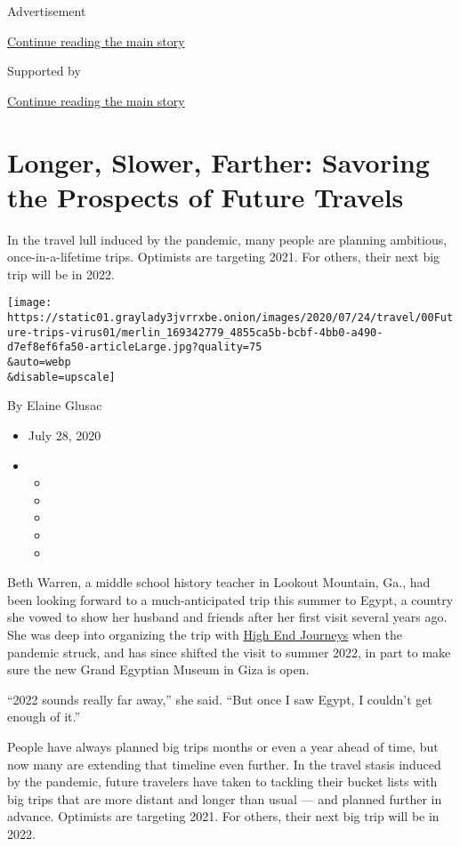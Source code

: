 Advertisement

\protect\hyperlink{after-top}{Continue reading the main story}

Supported by

\protect\hyperlink{after-sponsor}{Continue reading the main story}

\hypertarget{longer-slower-farther-savoring-the-prospects-of-future-travels}{%
\section{Longer, Slower, Farther: Savoring the Prospects of Future
Travels}\label{longer-slower-farther-savoring-the-prospects-of-future-travels}}

In the travel lull induced by the pandemic, many people are planning
ambitious, once-in-a-lifetime trips. Optimists are targeting 2021. For
others, their next big trip will be in 2022.

\texttt{[image: https://static01.graylady3jvrrxbe.onion/images/2020/07/24/travel/00Future-trips-virus01/merlin\_169342779\_4855ca5b-bcbf-4bb0-a490-d7ef8ef6fa50-articleLarge.jpg?quality=75\\\&auto=webp\\\&disable=upscale]}

By Elaine Glusac

\begin{itemize}
\item
  July 28, 2020
\item
  \begin{itemize}
  \item
  \item
  \item
  \item
  \item
  \end{itemize}
\end{itemize}

Beth Warren, a middle school history teacher in Lookout Mountain, Ga.,
had been looking forward to a much-anticipated trip this summer to
Egypt, a country she vowed to show her husband and friends after her
first visit several years ago. She was deep into organizing the trip
with \href{https://www.highendjourneys.com/}{High End Journeys} when the
pandemic struck, and has since shifted the visit to summer 2022, in part
to make sure the new Grand Egyptian Museum in Giza is open.

``2022 sounds really far away,'' she said. ``But once I saw Egypt, I
couldn't get enough of it.''

People have always planned big trips months or even a year ahead of
time, but now many are extending that timeline even further. In the
travel stasis induced by the pandemic, future travelers have taken to
tackling their bucket lists with big trips that are more distant and
longer than usual --- and planned further in advance. Optimists are
targeting 2021. For others, their next big trip will be in 2022.

